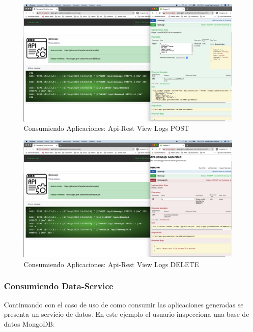 \documentclass[a4paper,11pt]{book}
\begin{document}
\begin{figure}[H]
\centering
\includegraphics[scale=0.2]{imagenes/casouso/1_10.png}
\caption{ Consumiendo Aplicaciones: Api-Rest View Logs POST  }
\end{figure}

\begin{figure}[H]
\centering
\includegraphics[scale=0.2]{imagenes/casouso/1_11.png}
\caption{ Consumiendo Aplicaciones: Api-Rest View Logs DELETE  }
\end{figure}

\subsubsection{Consumiendo Data-Service}

Continuando con el caso de uso de como consumir las aplicaciones generadas se presenta un servicio de datos. En este ejemplo el usuario inspecciona una base de datos MongoDB: 
\end{document}
